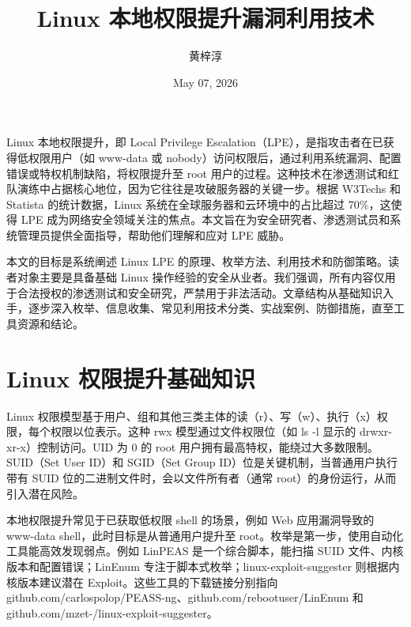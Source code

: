 \title{Linux 本地权限提升漏洞利用技术}
\author{黄梓淳}
\date{May 07, 2026}
\maketitle
Linux 本地权限提升，即 Local Privilege Escalation（LPE），是指攻击者在已获得低权限用户（如 www-data 或 nobody）访问权限后，通过利用系统漏洞、配置错误或特权机制缺陷，将权限提升至 root 用户的过程。这种技术在渗透测试和红队演练中占据核心地位，因为它往往是攻破服务器的关键一步。根据 W3Techs 和 Statista 的统计数据，Linux 系统在全球服务器和云环境中的占比超过 70\%{}，这使得 LPE 成为网络安全领域关注的焦点。本文旨在为安全研究者、渗透测试员和系统管理员提供全面指导，帮助他们理解和应对 LPE 威胁。\par
本文的目标是系统阐述 Linux LPE 的原理、枚举方法、利用技术和防御策略。读者对象主要是具备基础 Linux 操作经验的安全从业者。我们强调，所有内容仅用于合法授权的渗透测试和安全研究，严禁用于非法活动。文章结构从基础知识入手，逐步深入枚举、信息收集、常见利用技术分类、实战案例、防御措施，直至工具资源和结论。\par
\chapter{Linux 权限提升基础知识}
Linux 权限模型基于用户、组和其他三类主体的读（r）、写（w）、执行（x）权限，每个权限以位表示。这种 rwx 模型通过文件权限位（如 ls -l 显示的 drwxr-xr-x）控制访问。UID 为 0 的 root 用户拥有最高特权，能绕过大多数限制。SUID（Set User ID）和 SGID（Set Group ID）位是关键机制，当普通用户执行带有 SUID 位的二进制文件时，会以文件所有者（通常 root）的身份运行，从而引入潜在风险。\par
本地权限提升常见于已获取低权限 shell 的场景，例如 Web 应用漏洞导致的 www-data shell，此时目标是从普通用户提升至 root。枚举是第一步，使用自动化工具能高效发现弱点。例如 LinPEAS 是一个综合脚本，能扫描 SUID 文件、内核版本和配置错误；LinEnum 专注于脚本式枚举；linux-exploit-suggester 则根据内核版本建议潜在 Exploit。这些工具的下载链接分别指向 github.com/carlospolop/PEASS-ng、github.com/rebootuser/LinEnum 和 github.com/mzet-/linux-exploit-suggester。\par
